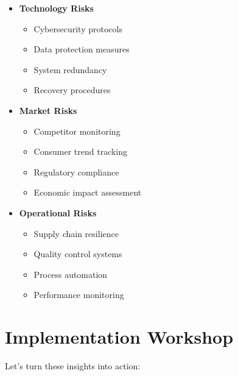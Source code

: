\begin{itemize}
    \item \textbf{Technology Risks}
    \begin{itemize}
        \item Cybersecurity protocols
        \item Data protection measures
        \item System redundancy
        \item Recovery procedures
    \end{itemize}

    \item \textbf{Market Risks}
    \begin{itemize}
        \item Competitor monitoring
        \item Consumer trend tracking
        \item Regulatory compliance
        \item Economic impact assessment
    \end{itemize}

    \item \textbf{Operational Risks}
    \begin{itemize}
        \item Supply chain resilience
        \item Quality control systems
        \item Process automation
        \item Performance monitoring
    \end{itemize}
\end{itemize}

\section{Implementation Workshop}\label{sec:implementation-workshop-main}

Let's turn these insights into action:


